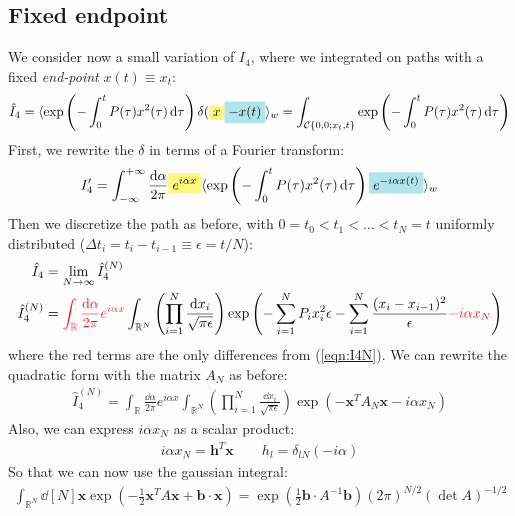 \documentclass[../template.tex]{subfiles}
\begin{document}
\subsection{Fixed endpoint}
We consider now a small variation of $I_4$, where we integrated on paths with a fixed \textit{end-point} $x(t) \equiv x_t$:
\begin{align*}
    \hat{I}_4 = \langle \exp\left(-\int_0^t P(\tau) x^2(\tau) \dd{\tau}\right) \delta(\hlc{Yellow}{x}\hlc{SkyBlue}{-x(t)} \rangle_w = \int_{\mathcal{C}\{0,0;x_t,t\}} \exp\left(-\int_0^t P(\tau) x^2(\tau) \dd{\tau}\right)
\end{align*}   
First, we rewrite the $\delta$ in terms of a Fourier transform:
\begin{align*}
    I_4' = \int_{-\infty}^{+\infty} \frac{\dd{\alpha}}{2\pi} \hlc{Yellow}{e^{i \alpha x}} \langle \exp \left(-\int_0^t P(\tau) x^2(\tau) \dd{\tau}\right) \hlc{SkyBlue}{e^{-i \alpha x(t)}} \rangle_w 
\end{align*} 
Then we discretize the path as before, with $0 = t_0 < t_1 < \dots < t_N = t$ uniformly distributed ($\Delta t_i = t_i - t_{i-1} \equiv \epsilon = t/N$):
\begin{align*}
    \hat{I}_4 &= \lim_{N \to \infty} \hat{I}_4^{(N)}\\
    \hat{I}_4^{(N)} &= \textcolor{Red}{\int_{\mathbb{R}} \frac{\dd{\alpha}}{2 \pi}} \textcolor{Red}{e^{i \alpha x}} \int_{\mathbb{R}^N} \left(\prod_{i=1}^N \frac{\dd{x_i}}{\sqrt{ \pi \epsilon}} \right) \exp\left(-\sum_{i=1}^N P_i x_i^2 \epsilon - \sum_{i=1}^N \frac{(x_i - x_{i-1})^2}{\epsilon} \textcolor{Red}{- i \alpha x_N} \right)
\end{align*}
where the red terms are the only differences from (\ref{eqn:I4N}). We can rewrite the quadratic form with the matrix $A_N$ as before:
\begin{align*}
    \hat{I}_4^{(N)} = \int_{\mathbb{R}} \frac{\dd{\alpha}}{2 \pi} e^{i \alpha x} \int_{\mathbb{R}^N} \left(\prod_{i=1}^N \frac{\dd{x_i}}{\sqrt{\pi \epsilon}} \right) \exp(-\bm{x}^T A_N \bm{x} - i \alpha x_N)
\end{align*} 
Also, we can express $i \alpha x_N$ as a scalar product: 
\begin{align*}
    i \alpha x_N = \bm{h}^T \bm{x} \qquad h_l = \delta_{lN} (-i \alpha)
\end{align*}
So that we can now use the gaussian integral:
\begin{align*}
    \int_{\mathbb{R}^N} \dd[N]{\bm{x}} \exp\left(-\frac{1}{2} \bm{x}^T A \bm{x} + \bm{b} \cdot \bm{x} \right) = \exp \left(\frac{1}{2} \bm{b} \cdot A^{-1}\bm{b} \right) (2 \pi)^{N/2} (\operatorname{det} A)^{-1/2}
\end{align*}
\end{document}
